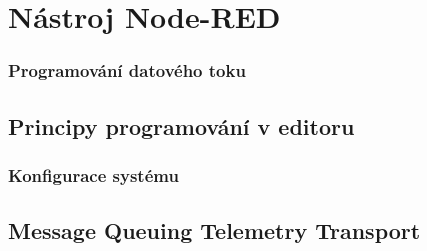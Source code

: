\chapter{Nástroj Node-RED}
\label{ch:nastroj-node-red}


\subsection{Programování datového toku}

\section{Principy programování v editoru}

\subsection{Konfigurace systému}


\section{Message Queuing Telemetry Transport}
